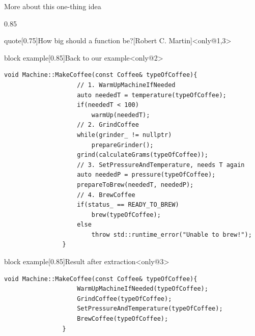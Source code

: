 \begin{frame}[fragile]{More about this one-thing idea}
    \begin{overlayarea}{\textwidth}{0.85\textheight}
        \begin{varblock}{quote}[0.75\textwidth]{How big should a function be?}[Robert C. Martin]<only@1,3>
        \end{varblock}
        \begin{varblock}{block example}[0.85\textwidth]{Back to our example}<only@2>
            \begin{lstlisting}[style=MyCpp]
                void Machine::MakeCoffee(const Coffee& typeOfCoffee){
                    // 1. WarmUpMachineIfNeeded
                    auto neededT = temperature(typeOfCoffee);
                    if(neededT < 100)
                        warmUp(neededT);
                    // 2. GrindCoffee
                    while(grinder_ != nullptr)
                        prepareGrinder();
                    grind(calculateGrams(typeOfCoffee));
                    // 3. SetPressureAndTemperature, needs T again
                    auto neededP = pressure(typeOfCoffee);
                    prepareToBrew(neededT, neededP);
                    // 4. BrewCoffee
                    if(status_ == READY_TO_BREW)
                        brew(typeOfCoffee);
                    else
                        throw std::runtime_error("Unable to brew!");
                }
            \end{lstlisting}
        \end{varblock}
        \begin{varblock}{block example}[0.85\textwidth]{Result after extraction}<only@3>
            \begin{lstlisting}[style=MyCpp]
                void Machine::MakeCoffee(const Coffee& typeOfCoffee){
                    WarmUpMachineIfNeeded(typeOfCoffee);
                    GrindCoffee(typeOfCoffee);
                    SetPressureAndTemperature(typeOfCoffee);
                    BrewCoffee(typeOfCoffee);
                }
            \end{lstlisting}
        \end{varblock}
    \end{overlayarea}
\end{frame}
